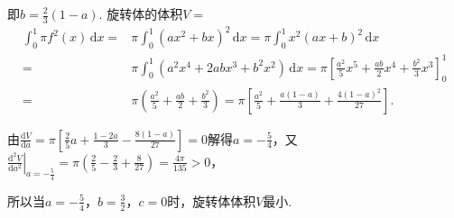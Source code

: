 \documentclass[../Main.tex]{subfiles}
\begin{document}
\begin{enumerate}
          即$b=\frac{2}{3}(1-a)$. 旋转体的体积$V=$
          \[
              \begin{aligned}
                  \int_{0}^{1}\pi f^{2}(x)\,\mathrm{d}x = & \pi\int_{0}^{1}\left(ax^{2}+bx\right)^{2}\,\mathrm{d}x = \pi\int_{0}^{1}x^{2}(ax+b)^{2}\,\mathrm{d}x                                           \\
                  =                                       & \pi\int_{0}^{1}(a^{2}x^{4}+2abx^{3}+b^{2}x^{2})\,\mathrm{d}x = \pi\left[\frac{a^2}{5}x^{5}+\frac{ab}{2}x^{4}+\frac{b^2}{3}x^{3}\right]_{0}^{1} \\
                  =                                       & \pi\left(\frac{a^2}{5}+\frac{ab}{2}+\frac{b^2}{3}\right) = \pi\left[\frac{a^2}{5}+\frac{a(1-a)}{3}+\frac{4(1-a)^2}{27}\right].
              \end{aligned}
          \]

          由$\frac{\mathrm{d}V}{\mathrm{d}a}=\pi\left[\frac{2}{5}a+\frac{1-2a}{3}-\frac{8(1-a)}{27}
                  \right]=0$解得$a=-\frac{5}{4}$，又$\left.\frac{\mathrm{d}^{2}V}{\mathrm{d}a^{2}}
              \right|_{a=-\frac{5}{4}}=\pi\left(\frac{2}{5}-\frac{2}{3}+\frac{8}{27}\right
              )=\frac{4\pi}{135}>0$，

          所以当$a=-\frac{5}{4}$，$b=\frac{3}{2}$，$c=0$时，旋转体体积$V$最小.
\end{enumerate}
\end{document}
